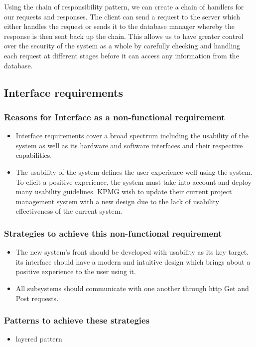 \documentclass[]{article}
\begin{document}
    Using the chain of responsibility pattern, we can create a chain of handlers for our requests and responses. The client can send a request to the server which either handles the request or sends it to the database manager whereby the response is then sent back up the chain. This allows us to have greater control over the security of the system as a whole by carefully checking and handling each request at different stages before it can access any information from the database.
    
\subsection{Interface requirements}
    \subsubsection{Reasons for Interface as a non-functional requirement}
    \begin{itemize}
        \item Interface requirements cover a broad spectrum including the usability of the system as well as its hardware and software interfaces and their respective capabilities. 
        
        \item The usability of the system defines the user experience well using the system. To elicit a positive experience, the system must take into account and deploy many usability guidelines. KPMG wish to update their current project management system with a new design due to the lack of usability effectiveness of the current system. 
        
    \end{itemize}
    
    \subsubsection{Strategies to achieve this non-functional requirement}
    \begin{itemize}
        \item The new system's front should be developed with usability as its key target. its interface should have a modern and intuitive design which brings about a positive experience to the user using it.
        
        \item All subsystems should communicate with one another through http Get and Post requests.
    \end{itemize}
    
    \subsubsection{Patterns to achieve these strategies}
    \begin{itemize}
    \item layered pattern
    \end{itemize}
\end{document}

